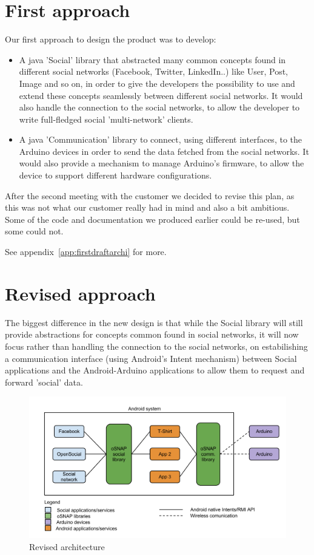 
\section{First approach}
Our first approach to design the product was to develop:

\begin{itemize}
\item A java 'Social' library that abstracted many common concepts found in different
social networks (Facebook, Twitter, LinkedIn..) like User, Post, Image and so on,
in order to give the developers the possibility to use and extend these concepts seamlessly
between different social networks. It would also handle the connection to the social networks,
to allow the developer to write full-fledged social 'multi-network' clients.

\item A java 'Communication' library to connect, using different interfaces, to the Arduino devices
in order to send the data fetched from the social networks. It would also provide a mechanism to manage
Arduino's firmware, to allow the device to support different hardware configurations.
\end{itemize}

After the second meeting with the customer we decided to revise this plan, as this was not what
our customer really had in mind and also a bit ambitious. Some of the code and documentation we produced
earlier could be re-used, but some could not.

See appendix~\ref{app:firstdraftarchi} for more.

\newpage
\section{Revised approach}
The biggest difference in the new design is that while the Social library will still provide
abstractions for concepts common found in social networks, it will now focus rather than handling
the connection to the social networks, on estabilishing a communication interface (using Android's Intent mechanism)
between Social applications and the Android-Arduino applications to allow them to request and forward 'social' data.

\begin{figure}[h!]
\centering \includegraphics[scale=0.35]{img/architecture-toplevel.png}
\caption{Revised architecture}
\label{fig:architecture-toplevel}
\end{figure}

